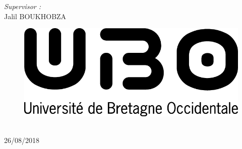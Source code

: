 \documentclass[12pt,oneside]{article}
\begin{document}
\begin{titlepage}
\begin{minipage}{0.4\textwidth}
\begin{flushleft}
\end{flushleft}
\end{minipage}
\begin{minipage}{0.4\textwidth}
\begin{flushright} \large

\emph{Supervisor :} \\
Jalil \textsc{BOUKHOBZA} %


\begin{figure}[H]
\centering
        			\includegraphics[scale=0.85]{img/ubo.png}
   			 \end{figure}

\end{flushright}
\end{minipage}\\[2cm]



{\large 26/08/2018}\\[2cm] %


 

\vfill %

\end{titlepage}

\tableofcontents


















\end{document}
